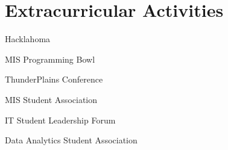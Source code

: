 \documentclass[letterpaper]{resumeconfig}
\begin{document}

\section{Extracurricular Activities}

    \begin{ActivitiesList}
        \item Hacklahoma
        \item MIS Programming Bowl
        \item ThunderPlains Conference
        \item MIS Student Association
        \item IT Student Leadership Forum
        \item Data Analytics Student Association
    \end{ActivitiesList}
\end{document}
